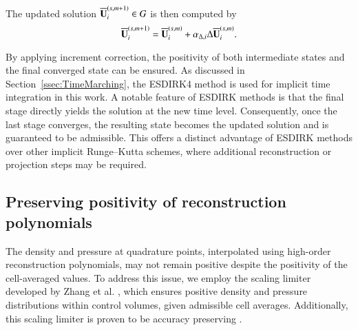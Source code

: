 The updated solution $\overline{\mathbf{U}}^{\left(s,m+1\right)}_i \in G$ is then computed by
\begin{equation}
\label{eq:increment-correction}
    \overline{\mathbf{U}}_i^{\left(s,m+1\right)} = \overline{\mathbf{U}}_i^{\left(s,m\right)} + \alpha_{\mathrm\Delta,i} \mathrm\Delta \overline{\mathbf{U}}_i^{\left(s,m\right)}.
\end{equation}

By applying increment correction, the positivity of both intermediate states and the final converged state can be ensured. As discussed in Section~\ref{ssec:TimeMarching}, the ESDIRK4 method is used for implicit time integration in this work. A notable feature of ESDIRK methods is that the final stage directly yields the solution at the new time level. Consequently, once the last stage converges, the resulting state becomes the updated solution and is guaranteed to be admissible. This offers a distinct advantage of ESDIRK methods over other implicit Runge–Kutta schemes, where additional reconstruction or projection steps may be required.

\subsection{Preserving positivity of reconstruction polynomials}
\label{ssec:rec-pp-limiter}

The density and pressure at quadrature points, interpolated using high-order reconstruction polynomials, may not remain positive despite the positivity of the cell-averaged values. To address this issue, we employ the scaling limiter developed by Zhang et al. \cite{zhang2010maximum,zhang2010positivity,zhang2012positivity}, which ensures positive density and pressure distributions within control volumes, given admissible cell averages. Additionally, this scaling limiter is proven to be accuracy preserving \cite{zhang2010positivity}.


